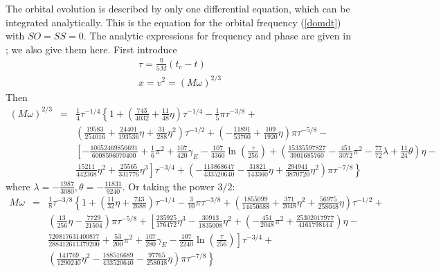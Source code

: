 \documentclass[11pt]{report}
\def\bea{\begin{eqnarray}}
\def\ena{\end{eqnarray}}
\begin{document}
The orbital evolution is described by only one differential equation, which can
be integrated analytically. This is the equation for the orbital frequency
(\ref{domdt}) with $SO=SS=0$. 
The analytic expressions for frequency and phase are given in \cite{Blanchet};
we also give them here. First introduce 
\bea
\tau = \frac{\eta}{5M}(t_c - t)\\
x = v^2 = (M\omega)^{2/3}
\ena
Then 
\bea
(M\omega)^{2/3} &=& \frac1{4}\tau^{-1/4}\left\{ 1 + \left(\frac{743}{4032} + \frac{11}{48}\eta\right)
\tau^{-1/4} - \frac1{5}\pi \tau^{-3/8} + \right.\nonumber \\
& &\left. \left( \frac{19583}{254016} + \frac{24401}{193536}\eta + \frac{31}{288}\eta^2\right)
\tau^{-1/2} + \left(-\frac{11891}{53760} + \frac{109}{1920}\eta\right)\pi \tau^{-5/8} -
\right. \nonumber \\
& & \left. \left[ -\frac{10052469856691}{6008596070400} + \frac1{6}\pi^2 + 
\frac{107}{420}\gamma_E - \frac{107}{3360}\ln\left(\frac{\tau}{256}\right) 
+ \left(\frac{15335597827}{3901685760} - \frac{451}{3072}\pi^2 - 
\frac{77}{72}\lambda + \frac{11}{24}\theta \right)\eta - \right. \right. \nonumber \\
& & \left. \left. \frac{15211}{442368}\eta^2 + \frac{25565}{331776}\eta^3 \right]
\tau^{-3/4} + \left(-\frac{113868647}{433520640} - \frac{31821}{143360}\eta + 
\frac{294941}{3870720}\eta^2\right)\pi\tau^{-7/8}  \right\}
\ena
where $\lambda = -\frac{1987}{3080}, \theta=-\frac{11831}{9240}$.
Or taking the power $3/2$:
\bea
M\omega &=& \frac1{8} \tau^{-3/8}\left\{ 1 + \left( \frac{11}{32}\eta + \frac{743}{2688}\right) 
\tau^{-1/4} - \frac{3}{10}\pi\tau^{-3/8} 
+ \left(\frac{1855099}{14450688} + \frac{371}{2048}\eta^2 + \frac{56975}{258048}\eta\right)
\tau^{-1/2} + \right. \nonumber \\
& &\left.\left( \frac{13}{256}\eta- \frac{7729}{21504}\right)\pi \tau^{-5/8} +
\left[ \frac{235925}{176472}\eta^3 - \frac{30913}{1835008}\eta^2 + \left(-\frac{451}{2048} \pi^2+ 
\frac{25302017977}{4161798144}\right) \eta -\right. \right. \nonumber \\
& & \left. \left.
\frac{720817631400877}{288412611379200} + \frac{53}{200}\pi^2 + \frac{107}{280}\gamma_E - 
\frac{107}{2240}\ln\left(\frac{\tau}{256}\right) \right]\tau^{-3/4} +
\right. \nonumber \\
& & \left. \left(\frac{141769}{1290240}\eta^2- \frac{188516689}{433520640} -\frac{97765}{258048}\eta\right) 
\pi\tau^{-7/8}
\right\}
\label{omNosp}
\ena

\end{document}
